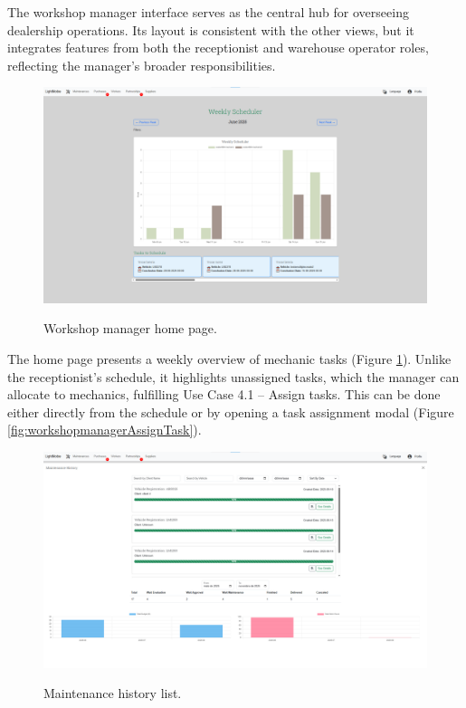 The workshop manager interface serves as the central hub for overseeing dealership operations. Its layout is consistent with the other views, but it integrates features from both the receptionist and warehouse operator roles, reflecting the manager's broader responsibilities.


\begin{figure}[h]
  \caption{Workshop manager home page.}
  \centering
  \includegraphics[width=\textwidth]{figs/Implementation/workshopmanager/homePage}
  \label{fig:workshopmanagerHomePage}
\end{figure}



The home page presents a weekly overview of mechanic tasks (Figure \ref{fig:workshopmanagerHomePage}). Unlike the receptionist's schedule, it highlights unassigned tasks, which the manager can allocate to mechanics, fulfilling Use Case 4.1 – Assign tasks. This can be done either directly from the schedule or by opening a task assignment modal (Figure \ref{fig:workshopmanagerAssignTask}).






\begin{figure}[h]
  \caption{Maintenance history list.}
  \centering
  \includegraphics[width=\textwidth]{figs/Implementation/workshopmanager/maintenanceHistory}
  \label{fig:maintenanceHistory}
\end{figure}



